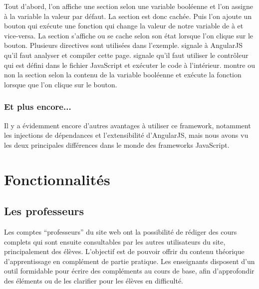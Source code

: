 \documentclass[a4paper,10pt,twoside]{sphinxmanual}
\begin{document}
Tout d'abord, l'on affiche une section selon une variable booléenne  et l'on assigne à la variable la valeur  par défaut. La section est donc cachée. Puis l'on ajoute un bouton qui exécute une fonction qui change la valeur de notre variable  de  à  et vice-versa. La section s'affiche ou se cache selon son état lorsque l'on clique sur le bouton. Plusieurs directives sont utilisées dans l'exemple.  signale à AngularJS qu'il faut analyser et compiler cette page.  signale qu'il faut utiliser le contrôleur  qui est défini dans le fichier JavaScript et exécuter le code à l'intérieur.  montre ou non la section selon la contenu de la variable booléenne  et  exécute la fonction  lorsque que l'on clique sur le bouton.


\subsection{Et plus encore...}
\label{angularjs:et-plus-encore}
Il y a évidemment encore d'autres avantages à utiliser ce framework, notamment les injections de dépendances et l'extensibilité d'AngularJS, mais nous avons vu les deux principales différences dans le monde des frameworks JavaScript.


\chapter{Fonctionnalités}
\label{functionalities::doc}\label{functionalities:fonctionnalites}

\section{Les professeurs}
\label{functionalities:les-professeurs}
Les comptes ``professeurs'' du site web ont la possibilité de rédiger des cours complets qui sont ensuite consultables par les autres utilisateurs du site, principalement des élèves. L'objectif est de pouvoir offrir du contenu théorique d'apprentissage en complément de partie pratique. Les enseignants disposent d'un outil formidable pour écrire des compléments au cours de base, afin d'approfondir des éléments ou de les clarifier pour les élèves en difficulté.
\end{document}
